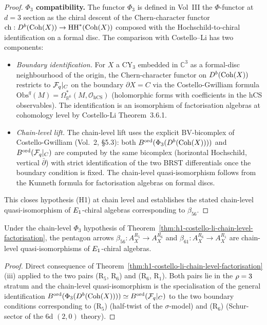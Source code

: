 \begin{proof}
\textbf{$\Phi_3$ compatibility.} The functor $\Phi_3$ is defined in
Vol~III the $\Phi$-functor at $d=3$ section as the chiral descent of the
Chern-character functor
$\mathrm{ch}: D^b(\mathrm{Coh}(X)) \to \mathrm{HH}^*(\mathrm{Coh}(X))$ composed with the
Hochschild-to-chiral identification on a formal disc. The comparison with
Costello--Li has two components:
\begin{itemize}
 \item \emph{Boundary identification.} For $X$ a CY$_3$
 embedded in $\mathbb{C}^3$ as a formal-disc neighbourhood of the
 origin, the Chern-character functor on $D^b(\mathrm{Coh}(X))$ restricts to
 $\mathcal{F}_{q}|_C$ on the boundary $\partial X = C$ via the Costello-Gwilliam
 formula $\mathrm{Obs}^q(M) = \Omega^*_{\mathbb{R}^6}(M,
 \mathcal{O}_{\mathrm{hCS}})$ (holomorphic forms with coefficients in
 the hCS observables). The identification is an isomorphism of
 factorisation algebras at cohomology level by
 Costello-Li Theorem~3.6.1.
 \item \emph{Chain-level lift.} The chain-level lift uses the
 explicit BV-bicomplex of Costello-Gwilliam (Vol.~2, \S 5.3): both
 $B^{\mathrm{ord}}(\Phi_3(D^b(\mathrm{Coh}(X))))$ and $B^{\mathrm{ord}}(\mathcal{F}_{q}|_C)$
 are computed by the same bicomplex (horizontal Hochschild, vertical
 $\bar\partial$) with strict identification of the two BRST
 differentials once the boundary condition is fixed. The chain-level
 quasi-isomorphism follows from the Kunneth formula for
 factorisation algebras on formal discs.
\end{itemize}

This closes hypothesis (H1) at chain level and establishes the stated
chain-level quasi-isomorphism of $E_{1}$-chiral algebras corresponding to
$\beta_{56}$.
\end{proof}

\begin{corollary}
\label{cor:h1-beta56-beta61-chain-level}
Under the chain-level $\Phi_3$ hypothesis of
Theorem~\ref{thm:h1-costello-li-chain-level-factorisation}, the pentagon
arrows $\beta_{56}: A_X^{R_5} \to A_X^{R_6}$ and
$\beta_{61}: A_X^{R_6} \to A_X^{R_1}$ are chain-level quasi-isomorphisms of
$E_{1}$-chiral algebras.
\end{corollary}

\begin{proof}
Direct consequence of
Theorem~\ref{thm:h1-costello-li-chain-level-factorisation}(iii) applied to the
two pairs (R$_5$, R$_6$) and (R$_6$, R$_1$). Both pairs lie in the $\rho = 3$
stratum and the chain-level quasi-isomorphism is the specialisation of the
general identification
$B^{\mathrm{ord}}(\Phi_3(D^b(\mathrm{Coh}(X)))) \simeq B^{\mathrm{ord}}(\mathcal{F}_{q}|_C)$ to the
two boundary conditions corresponding to (R$_5$) (half-twist of the
$\sigma$-model) and (R$_6$) (Schur-sector of the 6d $(2, 0)$ theory).
\end{proof}


